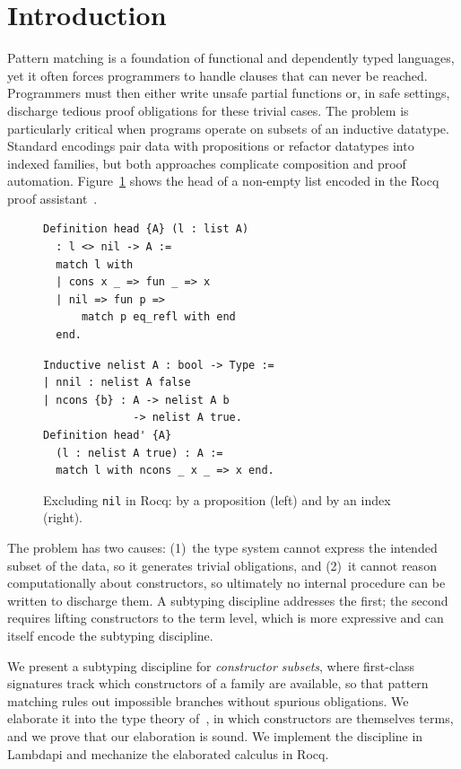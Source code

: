 \documentclass[12pt]{article}
\begin{document}
\section{Introduction}
Pattern matching is a foundation of functional and dependently typed languages, yet it often forces programmers to handle clauses that can never be reached.
Programmers must then either write unsafe partial functions or, in safe settings, discharge tedious proof obligations for these trivial cases.
The problem is particularly critical when programs operate on subsets of an inductive datatype.
Standard encodings pair data with propositions or refactor datatypes into indexed families, but both approaches complicate composition and proof automation.
Figure~\ref{fig:rocq} shows the head of a non-empty list encoded in the Rocq proof assistant~\cite{paulin1993inductive}.

\begin{figure}[ht]
\centering
\begin{minipage}[t]{0.45\textwidth}
\begin{lstlisting}
Definition head {A} (l : list A)
  : l <> nil -> A :=
  match l with
  | cons x _ => fun _ => x
  | nil => fun p =>
      match p eq_refl with end
  end.
\end{lstlisting}
\end{minipage}\hfill
\begin{minipage}[t]{0.52\textwidth}
\begin{lstlisting}
Inductive nelist A : bool -> Type :=
| nnil : nelist A false
| ncons {b} : A -> nelist A b
              -> nelist A true.
Definition head' {A}
  (l : nelist A true) : A :=
  match l with ncons _ x _ => x end.
\end{lstlisting}
\end{minipage}
\caption{Excluding \texttt{nil} in Rocq: by a proposition (left) and by an index (right).}
\label{fig:rocq}
\end{figure}

The problem has two causes:
(1)~the type system cannot express the intended subset of the data, so it generates trivial obligations, and
(2)~it cannot reason computationally about constructors, so ultimately no internal procedure can be written to discharge them.
A subtyping discipline addresses the first; the second requires lifting constructors to the term level, which is more expressive and can itself encode the subtyping discipline.

We present a subtyping discipline for \emph{constructor subsets}, where first-class signatures track which constructors of a family are available, so that pattern matching rules out impossible branches without spurious obligations.
We elaborate it into the type theory of~\cite{dagand2012elaborating}, in which constructors are themselves terms, and we prove that our elaboration is sound.
We implement the discipline in Lambdapi and mechanize the elaborated calculus in Rocq.
\end{document}
